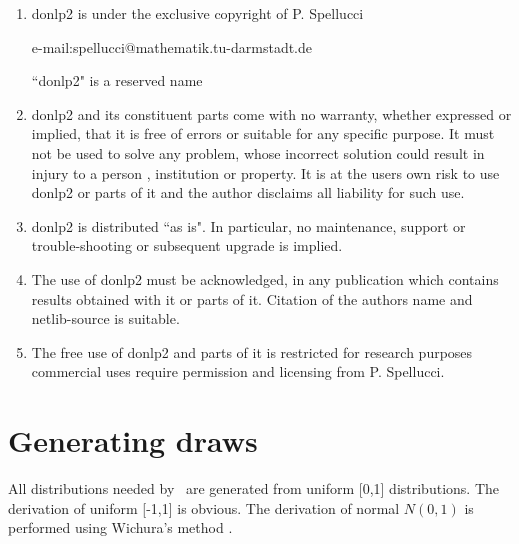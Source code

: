 \documentclass[12pt]{memoir}
\begin{document}
\begin{description}
         \begin{enumerate}
            \item donlp2 is under the exclusive copyright of P. Spellucci                   
               \begin{center}
                  e-mail:spellucci@mathematik.tu-darmstadt.de
               \end{center}
                ``donlp2" is a reserved name                                               
            \item donlp2 and its constituent parts come with no warranty, whether expressed or 
               implied, that it is free of errors or suitable for any specific purpose.                                                         
               It must not be used to solve any problem, whose incorrect solution        
               could result in injury to a person , institution or property.             
               It is at the users own risk to use donlp2 or parts of it and the          
               author disclaims all liability for such use.                              
            \item donlp2 is distributed ``as is". In particular, no maintenance, support     
               or trouble-shooting or subsequent upgrade is implied.                     
            \item The use of donlp2 must be acknowledged, in any publication which contains 
               results obtained with it or parts of it. Citation of the authors name     
               and netlib-source is suitable.                                            
            \item The free use of donlp2 and parts of it is restricted for research purposes
               commercial uses require permission and licensing from P. Spellucci.       
         \end{enumerate}
     \end{description}


\section{Generating draws}

All distributions needed by \BIOGEME\ are generated from uniform [0,1]
distributions. The derivation of uniform [-1,1] is obvious. The
derivation of normal $N(0,1)$ is performed using Wichura's method
\cite{Wich88}. 
\end{document}
